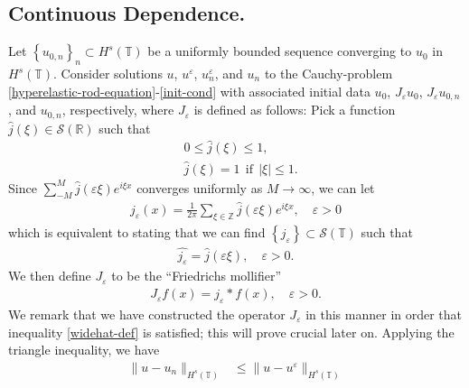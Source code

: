 \documentclass[12pt,reqno]{amsart}
\newcommand{\rr}{\mathbb{R}}
\newcommand{\zz}{\mathbb{Z}}
\newcommand{\ci}{\mathbb{T}}
\newcommand{\ee}{\varepsilon}
\theoremstyle{plain}  %
\theoremstyle{definition}
\begin{document}
\begin{appendices}
	\subsection{Continuous Dependence.}
	Let $\left\{ u_{0, n} \right\}_n \subset H^s(\ci)$ be a uniformly bounded
sequence converging to $u_0$ in $H^s(\ci)$.
Consider solutions $u $, $u^\ee$, $u^\ee_n$, and $u_n$ to the Cauchy-problem
\eqref{hyperelastic-rod-equation}-\eqref{init-cond}
with associated initial data $u_0$, $J_\ee u_0$,
$J_\ee u_{0,n}$, and $u_{0,n}$, respectively, where $J_\ee$ is defined as follows: Pick a function $\widehat{j}(\xi) \in \mathcal{S}(\rr)$ such that
	\begin{equation}
		\label{0u}
		\begin{split}
			& 0 \le \widehat{j}(\xi) \le 1,
			\\
			& \widehat{j}(\xi) = 1 \ \ \text{if} \ \ |\xi| \le 1.
		\end{split}
	\end{equation}
	Since $\sum_{-M}^M \widehat{j}(\ee \xi) e^{i \xi x}$ converges uniformly as $M \to
	\infty$, we can let
	\begin{equation}
		\begin{split}
			j_\ee (x) = \frac{1}{2 \pi}\sum_{\xi \in \zz}
			\widehat{j}(\ee \xi) e^{i \xi x}, \quad \ee > 0
			\label{parseval-def}
		\end{split}
	\end{equation}
	which is equivalent to stating that we can find $\left\{ j_\ee
	\right\} \subset \mathcal{S}(\ci)$ such that
	\begin{equation}
		\begin{split}
			\widehat{j_\ee} = \widehat{j }(\ee \xi), \quad \ee > 0.
			\label{widehat-def}
		\end{split}
	\end{equation}
	We then define $J_\ee$ to be the ``Friedrichs mollifier''
	\begin{equation}
		\label{0'u}
		\begin{split}
			J_\ee f(x) = j_\ee * f(x), \quad \ee>0.
		\end{split}
	\end{equation}
We remark that we have constructed the operator $J_\ee$ in this manner in
order that inequality \eqref{widehat-def} is satisfied; this will prove
crucial later on.
%
Applying
the triangle inequality, we have
\begin{equation*}
	\begin{split}
		\|u - u_n\|_{H^s(\ci)}
		& \le \|u - u^\ee\|_{H^s(\ci)}

\end{split}
\end{equation*}
\end{appendices}
\end{document}
